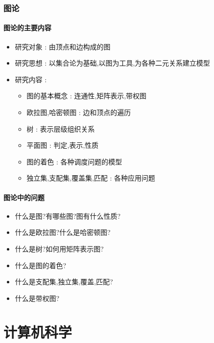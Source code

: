 \documentclass[UTF8,12pt]{ctexbook}
\begin{document}
{{{{}%

\subsection{图论}{

  \subsubsection{图论的主要内容}{
    \begin{itemize}
      \item 研究对象 : 由顶点和边构成的图
      \item 研究思想 : 以集合论为基础,以图为工具,为各种二元关系建立模型
      \item 研究内容 : \begin{itemize}
              \item 图的基本概念 : 连通性,矩阵表示,带权图
              \item 欧拉图,哈密顿图 : 边和顶点的遍历
              \item 树 : 表示层级组织关系
              \item 平面图 : 判定,表示,性质
              \item 图的着色 : 各种调度问题的模型
              \item 独立集,支配集,覆盖集,匹配 : 各种应用问题
            \end{itemize}
    \end{itemize}
  }%

  \subsubsection{图论中的问题}{
    \begin{itemize}
      \item 什么是图?有哪些图?图有什么性质?
      \item 什么是欧拉图?什么是哈密顿图?
      \item 什么是树?如何用矩阵表示图?
      \item 什么是图的着色?
      \item 什么是支配集,独立集,覆盖,匹配?
      \item 什么是带权图?
    \end{itemize}
  }%

}%

}%

}%

\chapter{计算机科学}{

}}
\end{document}
